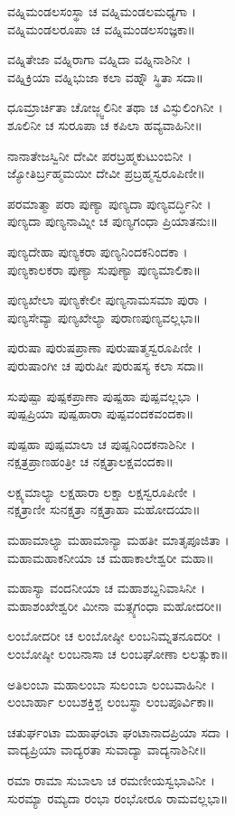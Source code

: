ವಹ್ನಿಮಂಡಲಸಂಸ್ಥಾ ಚ ವಹ್ನಿಮಂಡಲಮಧ್ಯಗಾ ।\\
ವಹ್ನಿಮಂಡಲರೂಪಾ ಚ ವಹ್ನಿಮಂಡಲಸಂಜ್ಞಕಾ॥

ವಹ್ನಿತೇಜಾ ವಹ್ನಿರಾಗಾ ವಹ್ನಿದಾ ವಹ್ನಿನಾಶಿನೀ ।\\
ವಹ್ನಿಕ್ರಿಯಾ ವಹ್ನಿಭುಜಾ ಕಲಾ ವಹ್ನೌ ಸ್ಥಿತಾ ಸದಾ॥

ಧೂಮ್ರಾರ್ಚಿತಾ ಚೋಜ್ಜ್ವಲಿನೀ ತಥಾ ಚ ವಿಸ್ಫುಲಿಂಗಿನೀ ।\\
ಶೂಲಿನೀ ಚ ಸುರೂಪಾ ಚ ಕಪಿಲಾ ಹವ್ಯವಾಹಿನೀ॥

ನಾನಾತೇಜಸ್ವಿನೀ ದೇವೀ ಪರಬ್ರಹ್ಮಕುಟುಂಬಿನೀ ।\\
ಜ್ಯೋತಿರ್ಬ್ರಹ್ಮಮಯೀ ದೇವೀ ಪ್ರಬ್ರಹ್ಮಸ್ವರೂಪಿಣೀ॥

ಪರಮಾತ್ಮಾ ಪರಾ ಪುಣ್ಯಾ ಪುಣ್ಯದಾ ಪುಣ್ಯವರ್ದ್ಧಿನೀ ।\\
ಪುಣ್ಯದಾ ಪುಣ್ಯನಾಮ್ನೀ ಚ ಪುಣ್ಯಗಂಧಾ ಪ್ರಿಯಾತನುಃ॥

ಪುಣ್ಯದೇಹಾ ಪುಣ್ಯಕರಾ ಪುಣ್ಯನಿಂದಕನಿಂದಕಾ ।\\
ಪುಣ್ಯಕಾಲಕರಾ ಪುಣ್ಯಾ ಸುಪುಣ್ಯಾ ಪುಣ್ಯಮಾಲಿಕಾ॥

ಪುಣ್ಯಖೇಲಾ ಪುಣ್ಯಕೇಲೀ ಪುಣ್ಯನಾಮಸಮಾ ಪುರಾ ।\\
ಪುಣ್ಯಸೇವ್ಯಾ ಪುಣ್ಯಖೇಲ್ಯಾ ಪುರಾಣಪುಣ್ಯವಲ್ಲಭಾ॥

ಪುರುಷಾ ಪುರುಷಪ್ರಾಣಾ ಪುರುಷಾತ್ಮಸ್ವರೂಪಿಣೀ ।\\
ಪುರುಷಾಂಗೀ ಚ ಪುರುಷೀ ಪುರುಷಸ್ಯ ಕಲಾ ಸದಾ॥

ಸುಪುಷ್ಪಾ ಪುಷ್ಪಕಪ್ರಾಣಾ ಪುಷ್ಪಹಾ ಪುಷ್ಪವಲ್ಲಭಾ ।\\
ಪುಷ್ಪಪ್ರಿಯಾ ಪುಷ್ಪಹಾರಾ ಪುಷ್ಪವಂದಕವಂದಕಾ॥

ಪುಷ್ಪಹಾ ಪುಷ್ಪಮಾಲಾ ಚ ಪುಷ್ಪನಿಂದಕನಾಶಿನೀ ।\\
ನಕ್ಷತ್ರಪ್ರಾಣಹಂತ್ರೀ ಚ ನಕ್ಷತ್ರಾಲಕ್ಷವಂದಕಾ॥

ಲಕ್ಷ್ಯಮಾಲ್ಯಾ ಲಕ್ಷಹಾರಾ ಲಕ್ಷಾ ಲಕ್ಷಸ್ವರೂಪಿಣೀ ।\\
ನಕ್ಷತ್ರಾಣೀ ಸುನಕ್ಷತ್ರಾ ನಕ್ಷತ್ರಾಹಾ ಮಹೋದಯಾ॥

ಮಹಾಮಾಲ್ಯಾ ಮಹಾಮಾನ್ಯಾ ಮಹತೀ ಮಾತೃಪೂಜಿತಾ ।\\
ಮಹಾಮಹಾಕನೀಯಾ ಚ ಮಹಾಕಾಲೇಶ್ವರೀ ಮಹಾ॥

ಮಹಾಸ್ಯಾ ವಂದನೀಯಾ ಚ ಮಹಾಶಬ್ದನಿವಾಸಿನೀ ।\\
ಮಹಾಶಂಖೇಶ್ವರೀ ಮೀನಾ ಮತ್ಸ್ಯಗಂಧಾ ಮಹೋದರೀ॥

ಲಂಬೋದರೀ ಚ ಲಂಬೋಷ್ಠೀ ಲಂಬನಿಮ್ನತನೂದರೀ ।\\
ಲಂಬೋಷ್ಠೀ ಲಂಬನಾಸಾ ಚ ಲಂಬಘೋಣಾ ಲಲತ್ಸುಕಾ॥

ಅತಿಲಂಬಾ ಮಹಾಲಂಬಾ ಸುಲಂಬಾ ಲಂಬವಾಹಿನೀ ।\\
ಲಂಬಾರ್ಹಾ ಲಂಬಶಕ್ತಿಶ್ಚ ಲಂಬಸ್ಥಾ ಲಂಬಪೂರ್ವಿಕಾ॥

ಚತುರ್ಘಂಟಾ ಮಹಾಘಂಟಾ ಘಂಟಾನಾದಪ್ರಿಯಾ ಸದಾ ।\\
ವಾದ್ಯಪ್ರಿಯಾ ವಾದ್ಯರತಾ ಸುವಾದ್ಯಾ ವಾದ್ಯನಾಶಿನೀ॥

ರಮಾ ರಾಮಾ ಸುಬಾಲಾ ಚ ರಮಣೀಯಸ್ವಭಾವಿನೀ ।\\
ಸುರಮ್ಯಾ ರಮ್ಯದಾ ರಂಭಾ ರಂಭೋರೂ ರಾಮವಲ್ಲಭಾ॥

